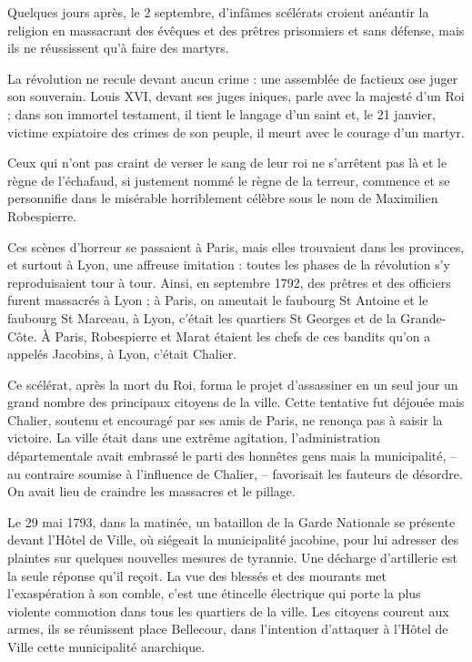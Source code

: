 \documentclass[11pt,a4paper]{report}
\begin{document}
Quelques jours après, le 2 septembre, d'infâmes scélérats croient anéantir la religion en massacrant des évêques et des prêtres prisonniers et sans défense, mais ils ne réussissent qu'à faire des martyrs.

La révolution ne recule devant aucun crime : une assemblée de factieux ose juger son souverain. Louis XVI, devant ses juges iniques, parle avec la majesté d'un Roi ; dans son immortel testament, il tient le langage d'un saint et, le 21 janvier, victime expiatoire des crimes de son peuple, il meurt avec le courage d'un martyr.

Ceux qui n'ont pas craint de verser le sang de leur roi ne s'arrêtent pas là et le règne de l'échafaud, si justement nommé le règne de la terreur, commence et se personnifie dans le misérable horriblement célèbre sous le nom de Maximilien Robespierre.

Ces scènes d'horreur se passaient à Paris, mais elles trouvaient dans les provinces, et surtout à Lyon, une affreuse imitation : toutes les phases de la révolution s'y reproduisaient tour à tour. Ainsi, en septembre 1792, des prêtres et des officiers furent massacrés à Lyon ; à Paris, on ameutait le faubourg St Antoine et le faubourg St Marceau, à Lyon, c'était les quartiers St Georges et de la Grande-Côte. À Paris, Robespierre et Marat étaient les chefs de ces bandits qu'on a appelés Jacobins, à Lyon, c'était Chalier.

Ce scélérat, après la mort du Roi, forma le projet d'assassiner en un seul jour un grand nombre des principaux citoyens de la ville. Cette tentative fut déjouée mais Chalier, soutenu et encouragé par ses amis de Paris, ne renonça pas à saisir la victoire. La ville était dans une extrême agitation, l'administration départementale avait embrassé le parti des honnêtes gens mais la municipalité, -- au contraire soumise à l'influence de Chalier, -- favorisait les fauteurs de désordre. On avait lieu de craindre les massacres et le pillage.

Le 29 mai 1793, dans la matinée, un bataillon de la Garde Nationale se présente devant l'Hôtel de Ville, où siégeait la municipalité jacobine, pour lui adresser des plaintes sur quelques nouvelles mesures de tyrannie. Une décharge d'artillerie est la seule réponse qu'il reçoit. La vue des blessés et des mourants met l'exaspération à son comble, c'est une étincelle électrique qui porte la plus violente commotion dans tous les quartiers de la ville. Les citoyens courent aux armes, ils se réunissent place Bellecour, dans l'intention d'attaquer à l'Hôtel de Ville cette municipalité anarchique.
\end{document}
